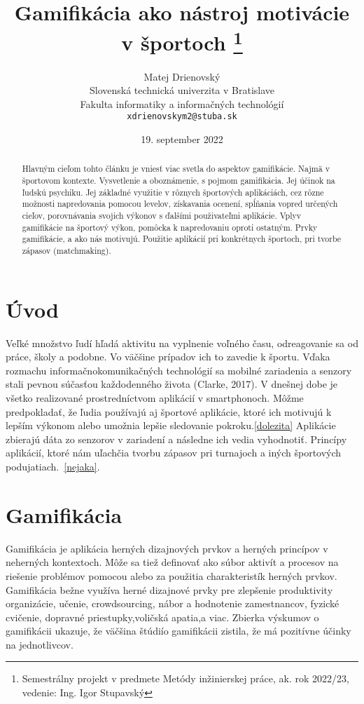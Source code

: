 \documentclass[10pt,twoside,slovak,a4paper]{article}
\title{Gamifikácia ako nástroj motivácie v športoch
\thanks{Semestrálny projekt v predmete Metódy inžinierskej práce, ak. rok 2022/23, vedenie: Ing. Igor Stupavský}} %
\author{Matej Drienovský\\[2pt]
	{\small Slovenská technická univerzita v Bratislave}\\
	{\small Fakulta informatiky a informačných technológií}\\
	{\small \texttt{xdrienovskym2@stuba.sk}}
	}
\date{\small 19. september 2022} %
\begin{document}
\maketitle

\begin{abstract}
Hlavným cieľom tohto článku je vniesť viac svetla do aspektov
gamifikácie. Najmä
v športovom kontexte. Vysvetlenie a oboznámenie, s pojmom gamifikácia. Jej účinok na
ľudskú psychiku. Jej základné využitie v rôznych športových aplikáciách, cez rôzne možnosti
napredovania pomocou levelov, získavania ocenení, spĺňania vopred určených cieľov,
porovnávania svojich výkonov s ďalšími použivateľmi aplikácie. Vplyv gamifikácie na športový
výkon, pomôcka k napredovaniu oproti ostatným. Prvky gamifikácie, a ako nás motivujú. Použitie aplikácií pri konkrétnych športoch, pri tvorbe zápasov
(matchmaking).
\end{abstract}



\section{Úvod}

Veľké množstvo ľudí hľadá aktivitu na vyplnenie voľného času, odreagovanie sa od práce, školy a podobne. Vo väčšine prípadov ich to zavedie k športu. 
Vďaka rozmachu informačnokomunikačných technológií sa mobilné zariadenia a senzory stali pevnou súčasťou každodenného života (Clarke, 2017).
V dnešnej dobe je všetko realizované prostredníctvom aplikácií v smartphonoch. 
Môžme predpokladať, že ľudia používajú aj športové aplikácie, ktoré ich motivujú k lepším výkonom alebo umožnia lepšie sledovanie pokroku.\ref{dolezita} Aplikácie zbierajú dáta zo senzorov v zariadení a následne ich vedia vyhodnotiť.
Princípy aplikácií, ktoré nám uľachčia tvorbu zápasov pri turnajoch a iných športových podujatiach.~\ref{nejaka}.   




\section{Gamifikácia} \label{gamifikácia}

\begin{figure*}[tbh]

Gamifikácia je aplikácia herných dizajnových prvkov a herných princípov v neherných kontextoch. Môže sa tiež definovať ako súbor aktivít a procesov na riešenie problémov pomocou alebo za použitia charakteristík herných prvkov. Gamifikácia bežne využíva herné dizajnové
prvky pre zlepšenie produktivity organizácie, učenie, crowdsourcing, nábor a hodnotenie zamestnancov, fyzické cvičenie, dopravné priestupky,voličská apatia,a viac. Zbierka výskumov o gamifikácii ukazuje, že väčšina štúdiío gamifikácii zistila, že má pozitívne účinky na jednotlivcov.

\end{figure*}
\end{document}
